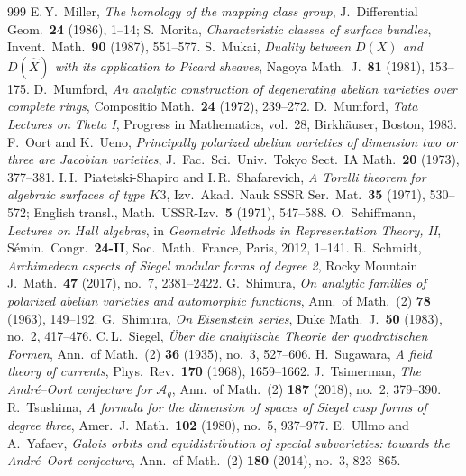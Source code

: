 \begin{thebibliography}{999}
 E.\,Y.~Miller, \emph{The homology of the mapping class group}, J.~Differential Geom.\ \textbf{24} (1986), 1--14; S.~Morita, \emph{Characteristic classes of surface bundles}, Invent.\ Math.\ \textbf{90} (1987), 551--577.
 S.~Mukai, \emph{Duality between $D(X)$ and $D(\hat{X})$ with its application to Picard sheaves}, Nagoya Math.\ J.\ \textbf{81} (1981), 153--175. %
 D.~Mumford, \emph{An analytic construction of degenerating abelian varieties over complete rings}, Compositio Math.\ \textbf{24} (1972), 239--272.
 D.~Mumford, \emph{Tata Lectures on Theta I}, Progress in Mathematics, vol.~28, Birkh\"auser, Boston, 1983.
 F.~Oort and K.~Ueno, \emph{Principally polarized abelian varieties of dimension two or three are Jacobian varieties}, J.~Fac.\ Sci.\ Univ.\ Tokyo Sect.\ IA Math.\ \textbf{20} (1973), 377--381.
 I.\,I.~Piatetski-Shapiro and I.\,R.~Shafarevich, \emph{A Torelli theorem for algebraic surfaces of type $K3$}, Izv.\ Akad.\ Nauk SSSR Ser.\ Mat.\ \textbf{35} (1971), 530--572; English transl., Math.\ USSR-Izv.\ \textbf{5} (1971), 547--588.
 O.~Schiffmann, \emph{Lectures on Hall algebras}, in \emph{Geometric Methods in Representation Theory, II}, S\'emin.\ Congr.\ \textbf{24-II}, Soc.\ Math.\ France, Paris, 2012, 1--141.
 R.~Schmidt, \emph{Archimedean aspects of Siegel modular forms of degree 2}, Rocky Mountain J.\ Math.\ \textbf{47} (2017), no.~7, 2381--2422.
 G.~Shimura, \emph{On analytic families of polarized abelian varieties and automorphic functions}, Ann.\ of Math.\ (2) \textbf{78} (1963), 149--192.
 G.~Shimura, \emph{On Eisenstein series}, Duke Math.\ J.\ \textbf{50} (1983), no.~2, 417--476.
 C.\,L.~Siegel, \emph{\"Uber die analytische Theorie der quadratischen Formen}, Ann.\ of Math.\ (2) \textbf{36} (1935), no.~3, 527--606.
 H.~Sugawara, \emph{A field theory of currents}, Phys.\ Rev.\ \textbf{170} (1968), 1659--1662.
 J.~Tsimerman, \emph{The Andr\'e--Oort conjecture for $\mathcal A_g$}, Ann.\ of Math.\ (2) \textbf{187} (2018), no.~2, 379--390.
 R.~Tsushima, \emph{A formula for the dimension of spaces of Siegel cusp forms of degree three}, Amer.\ J.\ Math.\ \textbf{102} (1980), no.~5, 937--977.
 E.~Ullmo and A.~Yafaev, \emph{Galois orbits and equidistribution of special subvarieties: towards the Andr\'e--Oort conjecture}, Ann.\ of Math.\ (2) \textbf{180} (2014), no.~3, 823--865.

\end{thebibliography}

